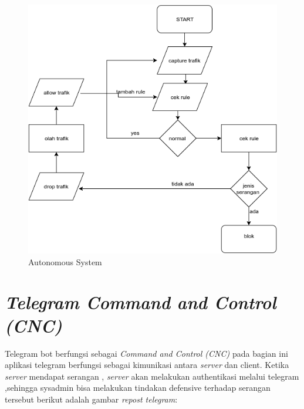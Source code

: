  \begin{figure}[H]
 	\centering
 	\includegraphics[scale = 0.8]{gambar/autonomusSystem}
 	\caption{Autonomous System}
 	\label{Autonomous System}
 \end{figure}
 
 
 
 \section{\emph{Telegram Command and Control (CNC)}}
 Telegram bot berfungsi sebagai \emph{Command and Control (CNC)} pada bagian ini
 aplikasi telegram berfungsi sebagai kimunikasi antara \emph{server} dan client. Ketika \emph{server}
 mendapat serangan , \emph{server} akan melakukan authentikasi melalui telegram ,sehingga
 sysadmin bisa melakukan tindakan defensive terhadap serangan tersebut berikut adalah gambar \emph{repost telegram}:
 
